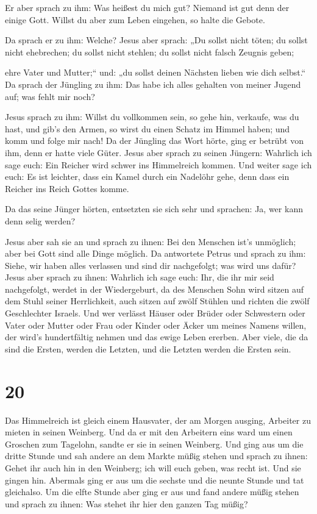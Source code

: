  Er aber sprach zu ihm: Was heißest du mich gut? Niemand
ist gut denn der einige Gott. Willst du aber zum Leben eingehen, so
halte die Gebote.

 Da sprach er zu ihm: Welche? Jesus aber sprach: „Du
sollst nicht töten; du sollst nicht ehebrechen; du sollst nicht stehlen;
du sollst nicht falsch Zeugnis geben;

 ehre Vater und Mutter;`` und: „du sollst deinen Nächsten
lieben wie dich selbst.``  Da sprach der Jüngling zu ihm:
Das habe ich alles gehalten von meiner Jugend auf; was fehlt mir noch?

 Jesus sprach zu ihm: Willst du vollkommen sein, so gehe
hin, verkaufe, was du hast, und gib's den Armen, so wirst du einen
Schatz im Himmel haben; und komm und folge mir nach!  Da
der Jüngling das Wort hörte, ging er betrübt von ihm, denn er hatte
viele Güter.  Jesus aber sprach zu seinen Jüngern:
Wahrlich ich sage euch: Ein Reicher wird schwer ins Himmelreich kommen.
 Und weiter sage ich euch: Es ist leichter, dass ein
Kamel durch ein Nadelöhr gehe, denn dass ein Reicher ins Reich Gottes
komme.

 Da das seine Jünger hörten, entsetzten sie sich sehr und
sprachen: Ja, wer kann denn selig werden?

 Jesus aber sah sie an und sprach zu ihnen: Bei den
Menschen ist's unmöglich; aber bei Gott sind alle Dinge möglich.
 Da antwortete Petrus und sprach zu ihm: Siehe, wir haben
alles verlassen und sind dir nachgefolgt; was wird uns dafür?
 Jesus aber sprach zu ihnen: Wahrlich ich sage euch: Ihr,
die ihr mir seid nachgefolgt, werdet in der Wiedergeburt, da des
Menschen Sohn wird sitzen auf dem Stuhl seiner Herrlichkeit, auch sitzen
auf zwölf Stühlen und richten die zwölf Geschlechter Israels.
 Und wer verlässt Häuser oder Brüder oder Schwestern oder
Vater oder Mutter oder Frau oder Kinder oder Äcker um meines Namens
willen, der wird's hundertfältig nehmen und das ewige Leben ererben.
 Aber viele, die da sind die Ersten, werden die Letzten,
und die Letzten werden die Ersten sein.

\hypertarget{section-19}{%
\section{20}\label{section-19}}

 Das Himmelreich ist gleich einem Hausvater, der am Morgen
ausging, Arbeiter zu mieten in seinen Weinberg.  Und da er
mit den Arbeitern eins ward um einen Groschen zum Tagelohn, sandte er
sie in seinen Weinberg.  Und ging aus um die dritte Stunde
und sah andere an dem Markte müßig stehen  und sprach zu
ihnen: Gehet ihr auch hin in den Weinberg; ich will euch geben, was
recht ist.  Und sie gingen hin. Abermals ging er aus um
die sechste und die neunte Stunde und tat gleichalso.  Um
die elfte Stunde aber ging er aus und fand andere müßig stehen und
sprach zu ihnen: Was stehet ihr hier den ganzen Tag müßig?

